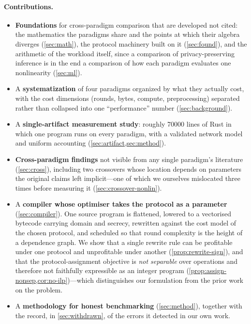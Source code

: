 \documentclass[11pt]{article}
\begin{document}
\paragraph{Contributions.}
\begin{itemize}
  \item \textbf{Foundations} for cross-paradigm comparison that are developed
    not cited: the mathematics the paradigms share and the points at
    which their algebra diverges (\cref{sec:math}), the protocol machinery built
    on it (\cref{sec:found}), and the arithmetic of the workload itself, since a
    comparison of privacy-preserving inference is in the end a comparison of how
    each paradigm evaluates one nonlinearity (\cref{sec:ml}).
  \item A \textbf{systematization} of four paradigms organized by what they
    actually cost, with the cost dimensions (rounds, bytes, compute,
    preprocessing) separated rather than collapsed into one ``performance''
    number (\cref{sec:background}).
  \item A \textbf{single-artifact measurement study}: roughly \num{70000} lines
    of Rust in which one program runs on every paradigm, with a validated
    network model and uniform accounting (\cref{sec:artifact,sec:method}).
  \item \textbf{Cross-paradigm findings} not visible from any single paradigm's
    literature (\cref{sec:cross}), including two crossovers whose location
    depends on parameters the original claims left implicit---one of which we
    ourselves mislocated three times before measuring it
    (\cref{sec:crossover-nonlin}).\vspace{-1pt}
  \item A \textbf{compiler whose optimiser takes the protocol as a parameter}
    (\cref{sec:compiler}). One source program is flattened, lowered to a
    vectorised bytecode carrying domain and secrecy, rewritten against the cost
    model of the chosen protocol, and scheduled so that round complexity is the
    height of a dependence graph. We show that a single rewrite rule can be
    profitable under one protocol and unprofitable under another
    (\cref{prop:rewrite-sign}), and that the protocol-assignment objective is
    \emph{not separable} over operations and therefore not faithfully expressible
    as an integer program (\cref{prop:assign-nonsep,cor:no-ilp})---which
    distinguishes our formulation from the prior work on the problem.
  \item A \textbf{methodology for honest benchmarking} (\cref{sec:method}),
    together with the record, in \cref{sec:withdrawn}, of the errors it detected
    in our own work.
\end{itemize}
\end{document}
